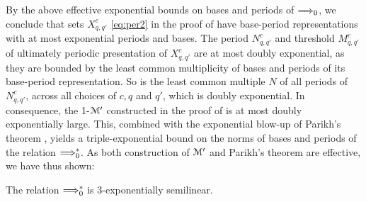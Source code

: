 
By the above effective exponential bounds on bases and periods of 
$\Longrightarrow_{0}$,
we conclude that sets $X^c_{q,q'}$ %
 \eqref{eq:per2} 
in the proof of  have 
base-period representations with at most exponential periods and bases.
The period $N^c_{q,q'}$ and threshold $M^c_{q,q'}$ 
of ultimately periodic presentation of $X^c_{q,q'}$ 
are at most doubly exponential, as they are bounded by 
the least common multiplicity of  bases and periods
of its base-period representation.
So is the least common multiple 
$N$ of all periods of $N^c_{q,q'}$,
across all choices of $c, q$ and $q'$, which is doubly exponential.
In consequence, the 1-\cm $\mathcal{M}'$
constructed in the proof of  is at most
doubly exponentially large.
This, combined with the exponential blow-up of Parikh's theorem
\cite[Thm.~11]{KopczynskiTo:LICS2010},
yields a triple-exponential bound on the norms of bases and periods of 
the relation $\Longrightarrow_{0}^*$.
As both construction of $\mathcal{M}'$ and Parikh's theorem are effective,
we have thus shown:

\begin{claim} \label{claim:sl2}
  The relation $\Longrightarrow_{0}^*$ is 3-exponentially semilinear.
\end{claim}







